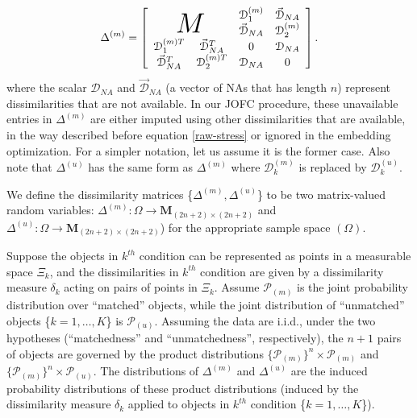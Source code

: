 \documentclass[12pt]{article} %
\newenvironment{remark}[1][Remark]{\begin{trivlist}
\item[\hskip \labelsep {\bfseries #1}]}{\end{trivlist}}
\begin{document}
 \begin{equation}
\Delta^{(m)}=  \left[ \begin{array}{cccc}
          \multicolumn{2}{c}{\multirow{2}{*}{\Huge{$M$}}} &  \mathcal{D}_1^{(m)} &\vec{\mathcal{D}}_{NA}\\
        & &  \vec{\mathcal{D}}_{NA}   & \mathcal{D}_2^{(m)} \\
				\mathcal{D}_1^{(m)T} & \vec{\mathcal{D}}_{NA}^T  &  0 & \mathcal{D}_{NA} \\
         \vec{\mathcal{D}}_{NA}^T & \mathcal{D}_2^{(m)T} & \mathcal{D}_{NA} &0\\
     \end{array}  \right].     \label{aug_omnibus} 
\end{equation}  where
the scalar $\mathcal{D}_{NA}$ and    $\vec{\mathcal{D}}_{NA}$ (a vector of NAs that has length $n$)   represent dissimilarities that are not available. 
In our JOFC procedure, these unavailable entries in $\Delta^{(m)}$ are either imputed using other dissimilarities that are available, in the way described before equation \eqref{raw-stress} or ignored in the embedding optimization. For a simpler  notation, let us assume it is the former case. Also note that $\Delta^{(u)}$  has the same form as $\Delta^{(m)}$ where $\mathcal{D}_k^{(m)}$ is replaced by $\mathcal{D}_k^{(u)}$.

We define the dissimilarity matrices \{$\Delta^{(m)},\Delta^{(u)}$\} to be  two matrix-valued random variables: $\Delta^{(m)}:\Omega \rightarrow \mathbf{M}_{(2n+2)\times (2n+2)} $ and  $\Delta^{(u)}:\Omega \rightarrow \mathbf{M}_{(2n+2)\times (2n+2)} $) for the appropriate sample  space $(\Omega)$.
\begin{remark}
Suppose the objects in $k^{th}$  condition  can be represented as points in a measurable space $\Xi_k$, and the dissimilarities in $k^{th}$ condition are given by  a dissimilarity measure $\delta_k$ acting on pairs of points in $\Xi_k$. Assume $\mathcal{P}_{(m)}$ is the joint probability distribution over ``matched'' objects, while the joint distribution of ``unmatched'' objects \{$k=1,\ldots,K$\}  is $\mathcal{P}_{(u)}$. Assuming the data are i.i.d., under the two hypotheses (``matchedness'' and ``unmatchedness'', respectively), the $n+1$ pairs of objects are governed  by the product distributions $\{\mathcal{P}_{(m)}\}^n \times \mathcal{P}_{(m)} $ and $\{\mathcal{P}_{(m)}\}^n \times \mathcal{P}_{(u)} $.  The distributions of $\Delta^{(m)}$ and $\Delta^{(u)}$ are the induced probability distributions of  these product distributions (induced by the  dissimilarity measure $\delta_k$ applied to  objects in $k^{th}$ condition \{$k=1,\ldots,K$\}).
\end{remark}
\end{document}
